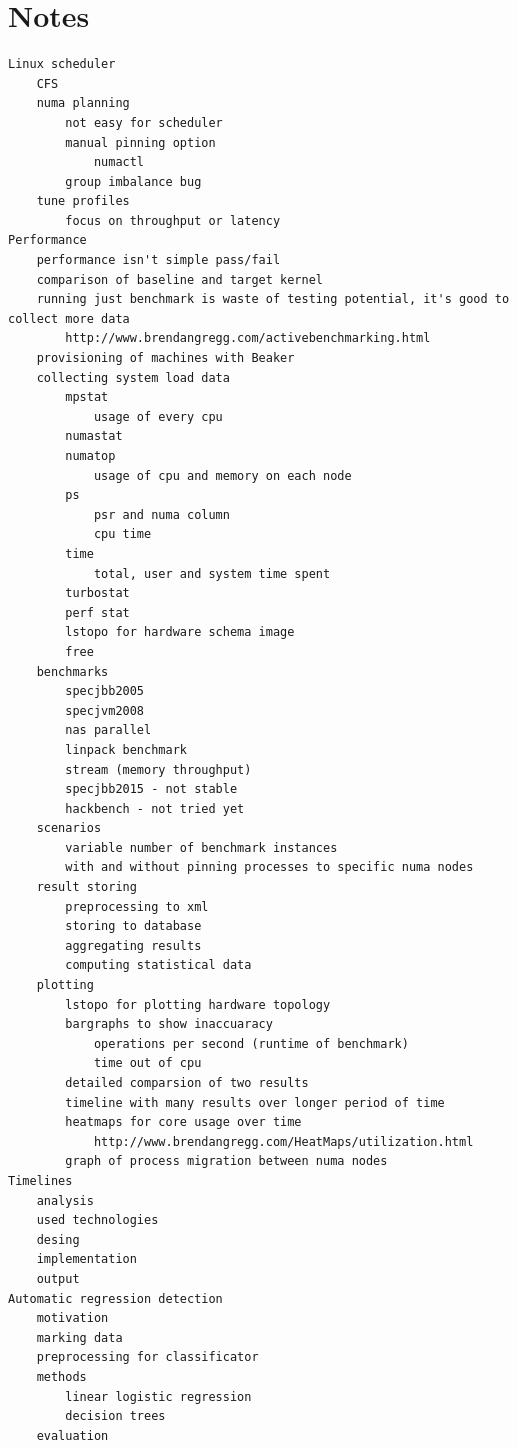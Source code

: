 

\chapter{Notes}
\begin{verbatim}
Linux scheduler
    CFS
    numa planning
        not easy for scheduler
        manual pinning option
            numactl
        group imbalance bug
    tune profiles
        focus on throughput or latency
Performance
    performance isn't simple pass/fail
    comparison of baseline and target kernel
    running just benchmark is waste of testing potential, it's good to collect more data
        http://www.brendangregg.com/activebenchmarking.html
    provisioning of machines with Beaker
    collecting system load data
        mpstat
            usage of every cpu
        numastat
        numatop
            usage of cpu and memory on each node
        ps
            psr and numa column
            cpu time
        time
            total, user and system time spent
        turbostat
        perf stat
        lstopo for hardware schema image
        free
    benchmarks
        specjbb2005
        specjvm2008
        nas parallel
        linpack benchmark
        stream (memory throughput)
        specjbb2015 - not stable
        hackbench - not tried yet
    scenarios
        variable number of benchmark instances
        with and without pinning processes to specific numa nodes
    result storing
        preprocessing to xml
        storing to database
        aggregating results
        computing statistical data
    plotting
        lstopo for plotting hardware topology
        bargraphs to show inaccuaracy
            operations per second (runtime of benchmark)
            time out of cpu
        detailed comparsion of two results
        timeline with many results over longer period of time
        heatmaps for core usage over time
            http://www.brendangregg.com/HeatMaps/utilization.html
        graph of process migration between numa nodes
Timelines
    analysis
    used technologies
    desing
    implementation
    output
Automatic regression detection
    motivation
    marking data
    preprocessing for classificator
    methods
        linear logistic regression
        decision trees
    evaluation
\end{verbatim}

